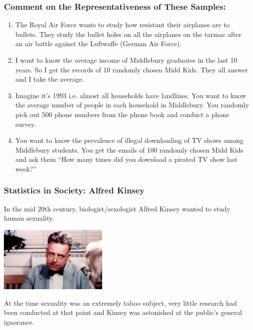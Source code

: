 \documentclass[slides]{beamer}
\begin{document}
\begin{frame}
\frametitle{Comment on the Representativeness of These Samples:}

\begin{small}
\begin{enumerate}
\item The Royal Air Force wants to study how resistant their airplanes are to bullets. They study the bullet holes on all the airplanes on the tarmac after an air battle against the Luftwaffe (German Air Force).
\item I want to know the average income of Middlebury graduates in the last 10 years.  So I get the records of 10 randomly chosen Midd Kids.  They all answer and I take the average.
\item Imagine it's 1993 i.e. almost all households have landlines.  You want to know the average number of people in each household in Middlebury.  You randomly pick out 500 phone numbers from the phone book and conduct a phone survey.
\item You want to know the prevalence of illegal downloading of TV shows among Middlebury students.  You get the emails of 100 randomly chosen Midd Kids and ask them ``How many times did you download a pirated TV show last week?''
\end{enumerate}
\end{small}

\end{frame}




\begin{frame}
\frametitle{Statistics in Society: Alfred Kinsey}
In the mid 20th century, biologist/sexologist Alfred Kinsey wanted to study human sexuality.  

\begin{center}
\includegraphics[width=0.4\textwidth]{./figure/alfred-kinsey.jpg}
\end{center}

\pause At the time sexuality was an extremely taboo subject, very little research had been conducted at that point and Kinsey was astonished at the public's general ignorance.  

\end{frame}
\end{document}
